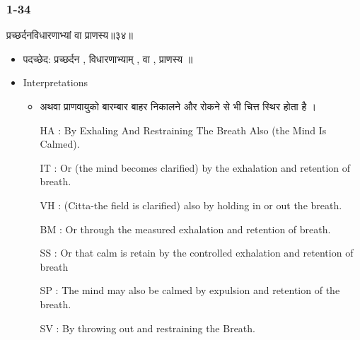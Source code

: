 \begin{frame}[fragile]\frametitle{1-34}
\begin{sanskrit}
प्रच्छर्दनविधारणाभ्यां वा प्राणस्य॥३४॥
\end{sanskrit}

	\begin{itemize}
	\item पदच्छेद: प्रच्छर्दन , विधारणाभ्याम् , वा , प्राणस्य ॥
	\item Interpretations
		\begin{itemize}	
		\item अथवा प्राणवायुको बारम्बार बाहर निकालने और रोकने से भी चित्त स्थिर होता है ।
		\item [HA]: By Exhaling And Restraining The Breath Also (the Mind Is Calmed).
		\item [IT]: Or (the mind becomes clarified) by the exhalation and retention of breath.
		\item [VH]: (Citta-the field is clarified) also by holding in or out the breath.
		\item [BM]: Or through the measured exhalation and retention of breath.
		\item [SS]: Or that calm is retain by the controlled exhalation and retention of breath
		\item [SP]: The mind may also be calmed by expulsion and retention of the breath.
		\item [SV]: By throwing out and restraining the Breath. 
		\end{itemize}
	\end{itemize}
	
\end{frame}



